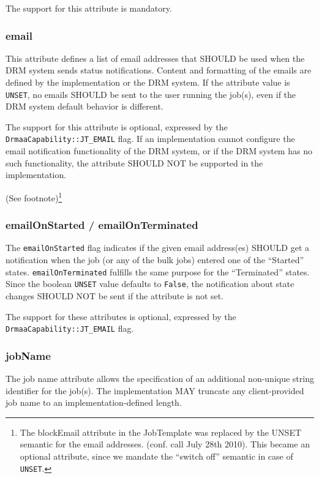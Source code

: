\documentclass{article}
\newcommand{\h}[1]{\lstinline|#1|}
\newcommand{\rat}[1]{ {\tiny(See footnote)}\footnote{#1} }
\begin{document}
The support for this attribute is mandatory.

\subsubsection{email}

This attribute defines a list of email addresses that SHOULD be used when the DRM system sends status notifications. Content and formatting of the emails are defined by the implementation or the DRM system. If the attribute value is \h{UNSET}, no emails SHOULD be sent to the user running the job(s), even if the DRM system default behavior is different.

The support for this attribute is optional, expressed by the \h{DrmaaCapability::JT_EMAIL} flag. If an implementation cannot configure the email notification functionality of the DRM system, or if the DRM system has no such functionality, the attribute SHOULD NOT be supported in the implementation.

\rat{
The blockEmail attribute in the JobTemplate was replaced by the UNSET semantic for the email addresses. (conf. call July 28th 2010). This became an optional attribute, since we mandate the ``switch off'' semantic in case of \h{UNSET}.
}

\subsubsection{emailOnStarted / emailOnTerminated}

The \h{emailOnStarted} flag indicates if the given email address(es) SHOULD get a notification when the job (or any of the bulk jobs) entered one of the \enquote{Started} states. \h{emailOnTerminated} fulfills the same purpose for the ``Terminated'' states. Since the boolean \h{UNSET} value defaults to \h{False}, the notification about state changes SHOULD NOT be sent if the attribute is not set. 

The support for these attributes is optional, expressed by the \h{DrmaaCapability::JT_EMAIL} flag.

\subsubsection{jobName}

The job name attribute allows the specification of an additional non-unique string identifier for the job(s). The  implementation MAY truncate any client-provided job name to an implementation-defined length.
\end{document}
